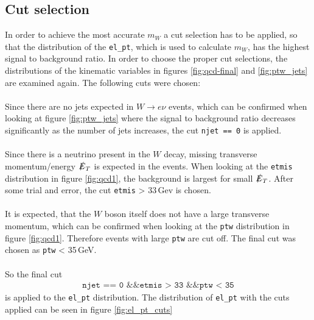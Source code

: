 \subsection{Cut selection}
    \label{sec:cut_seclection}
    In order to achieve the most accurate $m_W$ a cut selection has to be applied, so that the distribution of the \texttt{el\_pt}, which is used to calculate $m_W$,
    has the highest signal to background ratio. In order to choose the proper cut selections, the distributions of the kinematic variables in figures \ref{fig:qcd-final}
    and \ref{fig:ptw_jets} are examined again. The following cuts were chosen:\\
    \\
    Since there are no jets expected in $W \rightarrow e\nu$ events, which can be confirmed when looking at figure \ref{fig:ptw_jets} where the signal to  
    background ratio decreases significantly as the number of jets increases, the cut \texttt{njet == 0} is applied.\\
    \\
    Since there is a neutrino present in the $W$ decay, missing transverse momentum/energy $\slashed{E}_T$ is expected in the events.
    When looking at the \texttt{etmis} distribution in figure \ref{fig:qcd1}, the background is largest for small $\slashed{E}_T$. After some trial and error, the cut
    \texttt{etmis} > 33\,Gev is chosen.\\
    \\
    It is expected, that the $W$ boson itself does not have a large transverse momentum, which can be confirmed when looking at the \texttt{ptw} distribution
    in figure \ref{fig:qcd1}. Therefore events with large \texttt{ptw} are cut off. The final cut was chosen as \texttt{ptw} < 35\,GeV.\\
    \\
    So the final cut 
    \begin{align*}
        \texttt{njet == 0 \&\& etmis > 33 \&\& ptw < 35}
    \end{align*}
    is applied to the \texttt{el\_pt} distribution. The distribution of \texttt{el\_pt} with the cuts applied can be seen in figure \ref{fig:el_pt_cuts}
